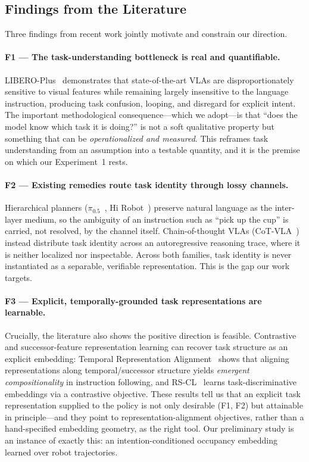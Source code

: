 \subsection{Findings from the Literature}
\label{sec:findings:lit}

Three findings from recent work jointly motivate and constrain our direction.

\paragraph{F1 --- The task-understanding bottleneck is real and quantifiable.}
LIBERO-Plus~\cite{liberoplus} demonstrates that state-of-the-art VLAs are
disproportionately sensitive to visual features while remaining largely
insensitive to the language instruction, producing task confusion, looping, and
disregard for explicit intent. The important methodological consequence---which
we adopt---is that ``does the model know which task it is doing?'' is not a soft
qualitative property but something that can be \emph{operationalized and
measured}. This reframes task understanding from an assumption into a testable
quantity, and it is the premise on which our Experiment~1 rests.

\paragraph{F2 --- Existing remedies route task identity through lossy channels.}
Hierarchical planners ($\pi_{0.5}$~\cite{pi05}, Hi Robot~\cite{hirobot}) preserve
natural language as the inter-layer medium, so the ambiguity of an instruction
such as ``pick up the cup'' is carried, not resolved, by the channel itself.
Chain-of-thought VLAs (CoT-VLA~\cite{cotvla}) instead distribute task identity
across an autoregressive reasoning trace, where it is neither localized nor
inspectable. Across both families, task identity is never instantiated as a
separable, verifiable representation. This is the gap our work targets.

\paragraph{F3 --- Explicit, temporally-grounded task representations are
learnable.} Crucially, the literature also shows the positive direction is
feasible. Contrastive and successor-feature representation learning can recover
task structure as an explicit embedding: Temporal Representation
Alignment~\cite{tra} shows that aligning representations along temporal/successor
structure yields \emph{emergent compositionality} in instruction following, and
RS-CL~\cite{rscl} learns task-discriminative embeddings via a contrastive
objective. These results tell us that an explicit task representation supplied to
the policy is not only desirable (F1, F2) but attainable in principle---and they
point to representation-alignment objectives, rather than a hand-specified
embedding geometry, as the right tool. Our preliminary study is an instance of
exactly this: an intention-conditioned occupancy embedding learned over robot
trajectories.

